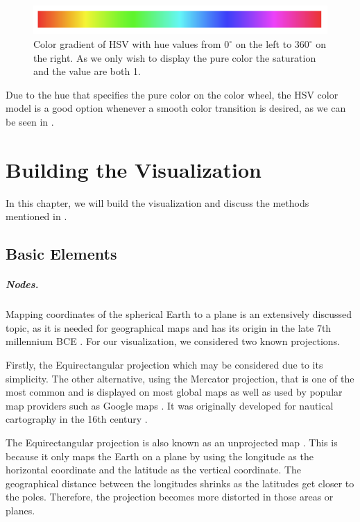 \documentclass
[
    paper = a4,
    pagesize,
    12 pt,
    oneside,                       %
    open = right,
    DIV = calc,
    BCOR = 0 mm,                   %
    bibtotoc
]
{scrbook}
\begin{document}
\begin{figure}[H]
  \begin{minipage}{\textwidth}
    \includegraphics[width=\textwidth]{Images/hsv.png}
    \caption[]{Color gradient of HSV with hue values from $0^\circ$ on the left to $360^\circ$ on the right. As we only wish to display the pure color the saturation and the value are both 1.}
    \label{fig:hsv}
    \end{minipage}
\end{figure}

Due to the hue that specifies the pure color on the color wheel, the HSV color model is a good option whenever a smooth color transition is desired, as we can be seen in  .

\chapter{Building the Visualization} \label{main}

In this chapter, we will build the visualization and discuss the methods mentioned in .

\section{Basic Elements} \label{graph}

\paragraph{Nodes.}
Mapping coordinates of the spherical Earth to a plane is an extensively discussed topic, as it is needed for geographical maps and has its origin in the late 7th millennium BCE \cite{cartography}.
For our visualization, we considered two known projections.

Firstly, the Equirectangular projection which may be considered due to its simplicity.
The other alternative, using the Mercator projection, that is one of the most common and is displayed on most global maps as well as used by popular map providers such as Google maps \cite{google_maps}.
It was originally developed for nautical cartography in the 16th century \cite{mercator}.

The Equirectangular projection is also known as an unprojected map \cite{equirectangular}.
This is because it only maps the Earth on a plane by using the longitude as the horizontal coordinate and the latitude as the vertical coordinate.
The geographical distance between the longitudes shrinks as the latitudes get closer to the poles.
Therefore, the projection becomes more distorted in those areas or planes.
\end{document}

